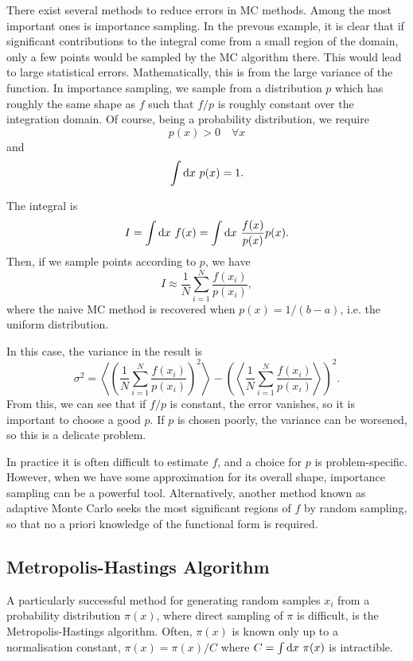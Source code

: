 There exist several methods to reduce errors in \gls{MC} methods. Among the most important ones is importance sampling. In the prevous example, it is clear that if significant contributions to the integral come from a small region of the domain, only a few points would be sampled by the \gls{MC} algorithm there. This would lead to large statistical errors. Mathematically, this is from the large variance of the function. In importance sampling, we sample from a distribution $p$ which has roughly the same shape as $f$ such that $f/p$ is roughly constant over the integration domain. Of course, being a probability distribution, we require
\begin{equation}
    p(x)>0 \quad \forall x
\end{equation}
and
\begin{equation}
    \int\mathrm{d} x \ p(x) = 1.
\end{equation}

The integral is
\begin{equation}
    I = \int\mathrm{d} x \  f(x) = \int\mathrm{d} x\ \frac{f(x)}{p(x)} p(x).
\end{equation}
Then, if we sample points according to $p$, we have
\begin{equation}
    I\approx \frac{1}{N}\sum^N_{i=1} \frac{f(x_i)}{p(x_i)},
\end{equation}
where the naive \gls{MC} method is recovered when $p(x)=1/(b-a)$, i.e. the uniform distribution.

In this case, the variance in the result is
\begin{equation}
    \sigma^2 = \left\langle \left( \frac{1}{N}\sum^N_{i=1} \frac{f(x_i)}{p(x_i)}\right)^2\right\rangle - \left( \left\langle  \frac{1}{N}\sum^N_{i=1} \frac{f(x_i)}{p(x_i)}\right\rangle\right)^2.
\end{equation}
From this, we can see that if $f/p$ is constant, the error vanishes, so it is important to choose a good $p$. If $p$ is chosen poorly, the variance can be worsened, so this is a delicate problem.

In practice it is often difficult to estimate $f$, and a choice for $p$ is problem-specific. However, when we have some approximation for its overall shape, importance sampling can be a powerful tool. Alternatively, another method known as adaptive Monte Carlo seeks the most significant regions of $f$ by random sampling, so that no a priori knowledge of the functional form is required.

\subsection{Metropolis-Hastings Algorithm}
\label{sec:mcmc}
A particularly successful method for generating random samples $x_i$ from a probability distribution $\pi(x)$, where direct sampling of $\pi$ is difficult, is the Metropolis-Hastings algorithm. Often, $\pi(x)$ is known only up to a normalisation constant, $\pi(x)=\pi(x)/C$ where $C=\int\mathrm{d} x\ \pi(x)$ is intractible.

